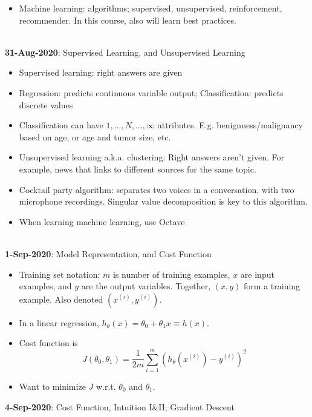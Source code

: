 \documentclass[10pt]{article}
\begin{document}
\begin{itemize}
  \item Machine learning: algorithms; supervised, unsupervised, reinforcement, recommender. In this course, also will learn best practices.
\end{itemize}
\hfill \\
{\large \textbf{31-Aug-2020}: Supervised Learning, and Unsupervised Learning}
\begin{itemize}
  \item Supervised learning: right answers are given
  \item Regression: predicts continuous variable output; Classification: predicts discrete values
  \item Classification can have $1,\dots,N,\dots,\infty$ attributes. E.g. benignness/malignancy based on age, or age and tumor size, etc.
  \item Unsupervised learning a.k.a. clustering: Right answers aren't given. For example, news that links to different sources for the same topic.
  \item Cocktail party algorithm: separates two voices in a conversation, with two microphone recordings. Singular value decomposition is key to this algorithm.
  \item When learning machine learning, use Octave
\end{itemize}
\hfill \\
{\large \textbf{1-Sep-2020}: Model Representation, and Cost Function}
\begin{itemize}
  \item Training set notation: $m$ is number of training examples, $x$ are input examples, and $y$ are the output variables. Together, $(x,y)$ form a training example. Also denoted $(x^{(i)},y^{(i)})$.
  \item In a linear regression, $h_{\theta}(x) = \theta_0 + \theta_1 x \equiv h(x)$.
  \item Cost function is 
    \begin{equation*}
      J(\theta_0, \theta_1) = \frac{1}{2m} \sum_{i=1}^m \left( h_{\theta}(x^{(i)}) - y^{(i)} \right)^2
    \end{equation*}
  \item Want to minimize $J$ w.r.t. $\theta_0$ and $\theta_1$.
\end{itemize}
{\large \textbf{4-Sep-2020}: Cost Function, Intuition I\&II; Gradient Descent}
\end{document}
